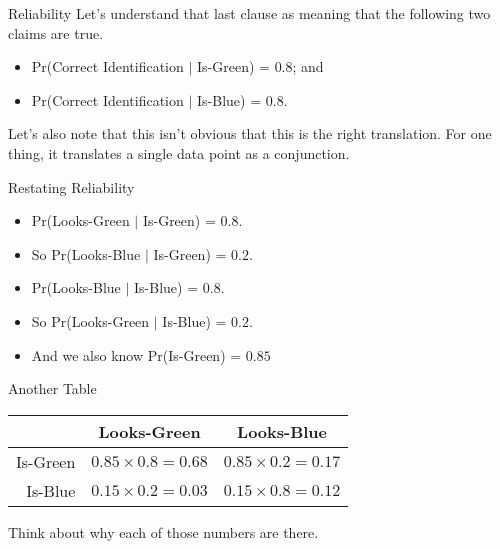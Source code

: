 \documentclass[
  ignorenonframetext,
]{beamer}
\providecommand{\tightlist}{%
  \setlength{\itemsep}{0pt}\setlength{\parskip}{0pt}}
\renewcommand{\,}{\text{, }}
\begin{document}
\begin{frame}{Reliability}
\protect\hypertarget{reliability}{}
Let's understand that last clause as meaning that the following two
claims are true.

\begin{itemize}
\tightlist
\item
  Pr(Correct Identification \(|\) Is-Green) = \(0.8\); and
\item
  Pr(Correct Identification \(|\) Is-Blue) = \(0.8\).
\end{itemize}

Let's also note that this isn't obvious that this is the right
translation. For one thing, it translates a single data point as a
conjunction.
\end{frame}

\begin{frame}{Restating Reliability}
\protect\hypertarget{restating-reliability}{}
\begin{itemize}[<+->]
\tightlist
\item
  Pr(Looks-Green \(|\) Is-Green) = \(0.8\).
\item
  So Pr(Looks-Blue \(|\) Is-Green) = \(0.2\).
\end{itemize}

\begin{itemize}[<+->]
\tightlist
\item
  Pr(Looks-Blue \(|\) Is-Blue) = \(0.8\).
\item
  So Pr(Looks-Green \(|\) Is-Blue) = \(0.2\).
\end{itemize}

\begin{itemize}[<+->]
\tightlist
\item
  And we also know Pr(Is-Green) = \(0.85\)
\end{itemize}
\end{frame}

\begin{frame}{Another Table}
\protect\hypertarget{another-table}{}
\begin{longtable}[]{@{}rcc@{}}
\toprule
& Looks-Green & Looks-Blue \\
\midrule
\endhead
Is-Green & \(0.85 \times 0.8 = 0.68\) & \(0.85 \times 0.2 = 0.17\) \\
Is-Blue & \(0.15 \times 0.2 = 0.03\) & \(0.15 \times 0.8 = 0.12\) \\
\bottomrule
\end{longtable}

Think about why each of those numbers are there.
\end{frame}
\end{document}
